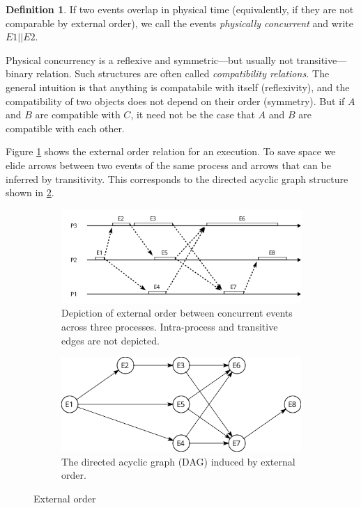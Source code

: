 \documentclass[]             %
{NASA}                       %
\theoremstyle{definition}
\newtheorem{definition}{Definition}[section]
\begin{document}
\begin{definition}
If two events overlap in physical time
(equivalently, if they are not comparable by external order), we call the events \emph{physically concurrent} and
write $E1 || E2$.
\end{definition}

Physical concurrency is a reflexive and symmetric---but usually not
transitive--- binary relation. Such structures are often called
\emph{compatibility relations.} The general intuition is that anything
is compatabile with itself (reflexivity), and the compatibility of two
objects does not depend on their order (symmetry). But if \(A\) and
\(B\) are compatible with \(C\), it need not be the case that \(A\) and
\(B\) are compatible with each other.

Figure \ref{fig:externalorderexec} shows the external order relation for
an execution. To save space we elide arrows between two events of the
same process and arrows that can be inferred by transitivity. This
corresponds to the directed acyclic graph structure shown in
\ref{fig:externalorderdag}.

\begin{figure}
     \begin{subfigure}[a]{1\textwidth}
         \center
         \includegraphics[scale=0.4]{images/externalorder.png}
         \caption{Depiction of external order between concurrent events across three processes. Intra-process and transitive edges are not depicted.}
         \label{fig:externalorderexec}
     \end{subfigure}
     \begin{subfigure}[b]{1\textwidth}
         \center
         \includegraphics[scale=0.25]{images/partialorder.png}
         \caption{The directed acyclic graph (DAG) induced by external order.}
         \label{fig:externalorderdag}
     \end{subfigure}
     \caption{External order}
     \label{fig:externalorder}
\end{figure}
\end{document}
